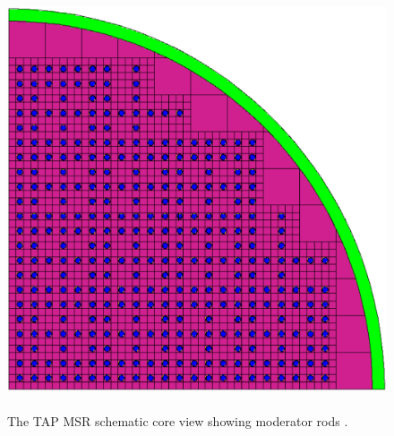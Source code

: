 \begin{frame}
\begin{textblock*}{12.5cm}
\begin{columns}
		\column[t]{5.5cm}
			\hspace{-9mm}
		\begin{figure}      
			\includegraphics[height=1.03\textwidth]{./images/tap_core_ornl.png}
			\caption{The \gls{TAP} \gls{MSR} schematic core view showing 
			moderator rods \cite{betzler_assessment_2017}.}
		\end{figure}
	\end{columns}
	
\end{textblock*}

\end{frame}


